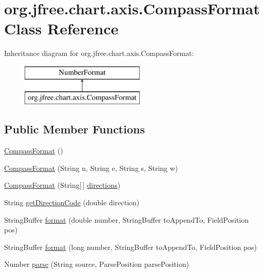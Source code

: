 \hypertarget{classorg_1_1jfree_1_1chart_1_1axis_1_1_compass_format}{}\section{org.\+jfree.\+chart.\+axis.\+Compass\+Format Class Reference}
\label{classorg_1_1jfree_1_1chart_1_1axis_1_1_compass_format}
Inheritance diagram for org.\+jfree.\+chart.\+axis.\+Compass\+Format\+:\begin{figure}[H]
\begin{center}
\leavevmode
\includegraphics[height=2.000000cm]{classorg_1_1jfree_1_1chart_1_1axis_1_1_compass_format}
\end{center}
\end{figure}
\subsection*{Public Member Functions}
\begin{DoxyCompactItemize}
\item 
\mbox{\hyperlink{classorg_1_1jfree_1_1chart_1_1axis_1_1_compass_format_ab2c9e184c22a05d816d7994d1e9e4ef7}{Compass\+Format}} ()
\item 
\mbox{\hyperlink{classorg_1_1jfree_1_1chart_1_1axis_1_1_compass_format_a960a9095abe5c352875423c4baf1113d}{Compass\+Format}} (String n, String e, String s, String w)
\item 
\mbox{\hyperlink{classorg_1_1jfree_1_1chart_1_1axis_1_1_compass_format_afe79973e291ebd98e8a0132b30247519}{Compass\+Format}} (String\mbox{[}$\,$\mbox{]} \mbox{\hyperlink{classorg_1_1jfree_1_1chart_1_1axis_1_1_compass_format_ae47ec4d6a4e761fc13ad334781d36f73}{directions}})
\item 
String \mbox{\hyperlink{classorg_1_1jfree_1_1chart_1_1axis_1_1_compass_format_a6826f21a78e26e7dd2fb406428d7b849}{get\+Direction\+Code}} (double direction)
\item 
String\+Buffer \mbox{\hyperlink{classorg_1_1jfree_1_1chart_1_1axis_1_1_compass_format_a66dcc24dd85f6a5354460112fc9288f7}{format}} (double number, String\+Buffer to\+Append\+To, Field\+Position pos)
\item 
String\+Buffer \mbox{\hyperlink{classorg_1_1jfree_1_1chart_1_1axis_1_1_compass_format_a496e84660fd565f7ae4b98e7eac56ec2}{format}} (long number, String\+Buffer to\+Append\+To, Field\+Position pos)
\item 
Number \mbox{\hyperlink{classorg_1_1jfree_1_1chart_1_1axis_1_1_compass_format_ac3361fceb883c49f756f97dc576f5ba6}{parse}} (String source, Parse\+Position parse\+Position)
\end{DoxyCompactItemize}

